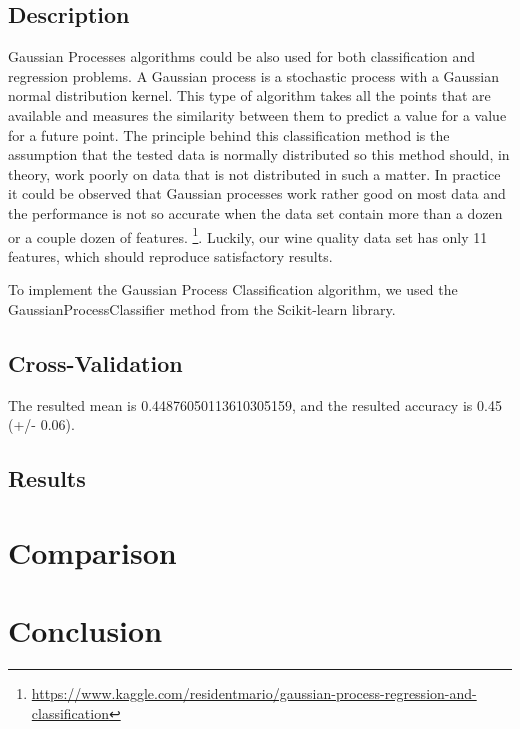 \documentclass[twocolumn]{scrartcl}
\begin{document}
\subsection{Description}
Gaussian Processes algorithms could be also used for both classification and regression problems. A Gaussian process is a stochastic process with a Gaussian normal distribution kernel. This type of algorithm takes all the points that are available and measures the similarity between them to predict a value for a value for a future point.
The principle behind this classification method is the assumption that the tested data is normally distributed so this method should, in theory, work poorly on data that is not distributed in such a matter. In practice it could be observed that Gaussian processes work rather good on most data and the performance is not so accurate when the data set contain more than a dozen or a couple dozen of features.
\footnote{\url{https://www.kaggle.com/residentmario/gaussian-process-regression-and-classification}}.
Luckily, our wine quality data set has only 11 features, which should reproduce satisfactory results.

To implement the Gaussian Process Classification algorithm, we used the GaussianProcessClassifier method from the Scikit-learn library.
\subsection{Cross-Validation}
The resulted mean is 0.44876050113610305159, and the resulted accuracy is 0.45 (+/- 0.06).
\subsection{Results}

\section{Comparison}
\section{Conclusion}

\printbibliography
\end{document}

